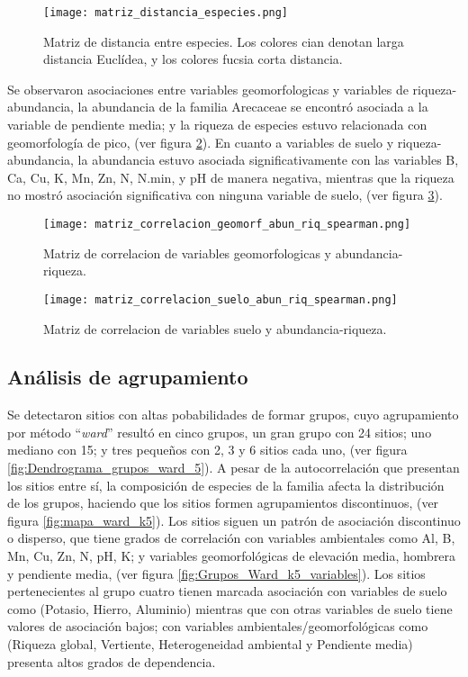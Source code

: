 \documentclass[11pt,]{article}
\begin{document}
\begin{figure}
\centering
\texttt{[image: matriz\_distancia\_especies.png]}
\caption{Matriz de distancia entre especies. Los colores cian denotan
larga distancia Euclídea, y los colores fucsia corta distancia.
\label{fig:matriz_distancia_especies}}
\end{figure}

Se observaron asociaciones entre variables geomorfologicas y variables
de riqueza-abundancia, la abundancia de la familia Arecaceae se encontró
asociada a la variable de pendiente media; y la riqueza de especies
estuvo relacionada con geomorfología de pico, (ver figura
\ref{fig:matriz_correlacion_geomorf_abun_riq_spearman}). En cuanto a
variables de suelo y riqueza-abundancia, la abundancia estuvo asociada
significativamente con las variables B, Ca, Cu, K, Mn, Zn, N, N.min, y
pH de manera negativa, mientras que la riqueza no mostró asociación
significativa con ninguna variable de suelo, (ver figura
\ref{fig:matriz_correlacion_suelo_abun_riq_spearman}).

\begin{figure}
\centering
\texttt{[image: matriz\_correlacion\_geomorf\_abun\_riq\_spearman.png]}
\caption{Matriz de correlacion de variables geomorfologicas y
abundancia-riqueza.
\label{fig:matriz_correlacion_geomorf_abun_riq_spearman}}
\end{figure}

\begin{figure}
\centering
\texttt{[image: matriz\_correlacion\_suelo\_abun\_riq\_spearman.png]}
\caption{Matriz de correlacion de variables suelo y abundancia-riqueza.
\label{fig:matriz_correlacion_suelo_abun_riq_spearman}}
\end{figure}

\subsection{Análisis de
agrupamiento}\label{anuxe1lisis-de-agrupamiento-1}

Se detectaron sitios con altas pobabilidades de formar grupos, cuyo
agrupamiento por método ``\emph{ward}'' resultó en cinco grupos, un gran
grupo con 24 sitios; uno mediano con 15; y tres pequeños con 2, 3 y 6
sitios cada uno, (ver figura \ref{fig:Dendrograma_grupos_ward_5}). A
pesar de la autocorrelación que presentan los sitios entre sí, la
composición de especies de la familia afecta la distribución de los
grupos, haciendo que los sitios formen agrupamientos discontinuos, (ver
figura \ref{fig:mapa_ward_k5}). Los sitios siguen un patrón de
asociación discontinuo o disperso, que tiene grados de correlación con
variables ambientales como Al, B, Mn, Cu, Zn, N, pH, K; y variables
geomorfológicas de elevación media, hombrera y pendiente media, (ver
figura \ref{fig:Grupos_Ward_k5_variables}). Los sitios pertenecientes al
grupo cuatro tienen marcada asociación con variables de suelo como
(Potasio, Hierro, Aluminio) mientras que con otras variables de suelo
tiene valores de asociación bajos; con variables
ambientales/geomorfológicas como (Riqueza global, Vertiente,
Heterogeneidad ambiental y Pendiente media) presenta altos grados de
dependencia.
\end{document}
